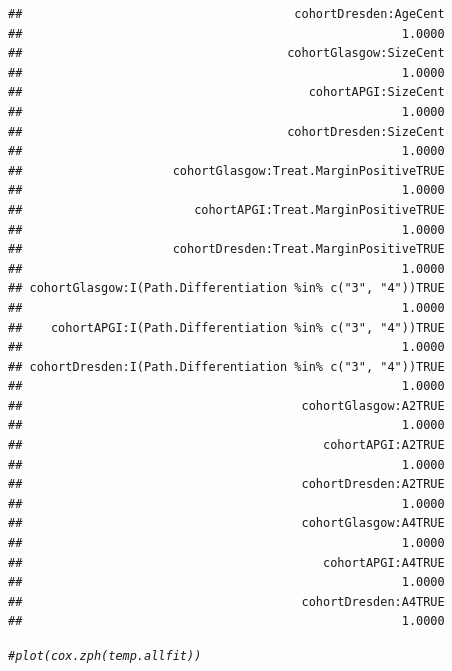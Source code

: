 \documentclass{article}\usepackage[]{graphicx}\usepackage[]{color}
\makeatletter
\newcommand{\hlcom}[1]{\textcolor[rgb]{0.678,0.584,0.686}{\textit{#1}}}%
\newenvironment{kframe}{%
 \def\at@end@of@kframe{}%
 \ifinner\ifhmode%
  \def\at@end@of@kframe{\end{minipage}}%
  \begin{minipage}{\columnwidth}%
 \fi\fi%
 \def\FrameCommand##1{\hskip\@totalleftmargin \hskip-\fboxsep
 \colorbox{shadecolor}{##1}\hskip-\fboxsep
     \hskip-\linewidth \hskip-\@totalleftmargin \hskip\columnwidth}%
 \MakeFramed {\advance\hsize-\width
   \@totalleftmargin\z@ \linewidth\hsize
   \@setminipage}}%
 {\par\unskip\endMakeFramed%
 \at@end@of@kframe}
\newenvironment{knitrout}{}{} %
\makeatother
\begin{document}
\begin{knitrout}
\begin{kframe}
\begin{verbatim}
##                                      cohortDresden:AgeCent 
##                                                     1.0000 
##                                     cohortGlasgow:SizeCent 
##                                                     1.0000 
##                                        cohortAPGI:SizeCent 
##                                                     1.0000 
##                                     cohortDresden:SizeCent 
##                                                     1.0000 
##                     cohortGlasgow:Treat.MarginPositiveTRUE 
##                                                     1.0000 
##                        cohortAPGI:Treat.MarginPositiveTRUE 
##                                                     1.0000 
##                     cohortDresden:Treat.MarginPositiveTRUE 
##                                                     1.0000 
## cohortGlasgow:I(Path.Differentiation %in% c("3", "4"))TRUE 
##                                                     1.0000 
##    cohortAPGI:I(Path.Differentiation %in% c("3", "4"))TRUE 
##                                                     1.0000 
## cohortDresden:I(Path.Differentiation %in% c("3", "4"))TRUE 
##                                                     1.0000 
##                                       cohortGlasgow:A2TRUE 
##                                                     1.0000 
##                                          cohortAPGI:A2TRUE 
##                                                     1.0000 
##                                       cohortDresden:A2TRUE 
##                                                     1.0000 
##                                       cohortGlasgow:A4TRUE 
##                                                     1.0000 
##                                          cohortAPGI:A4TRUE 
##                                                     1.0000 
##                                       cohortDresden:A4TRUE 
##                                                     1.0000
\end{verbatim}
\begin{alltt}
\hlcom{#plot(cox.zph(temp.allfit))}
\end{alltt}
\end{kframe}
\end{knitrout}
\end{document}
